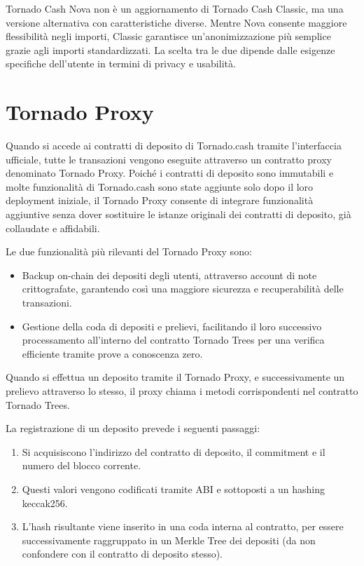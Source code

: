 Tornado Cash Nova non è un aggiornamento di Tornado Cash Classic, ma una versione alternativa con caratteristiche diverse. Mentre Nova consente maggiore flessibilità negli importi, Classic garantisce un'anonimizzazione più semplice grazie agli importi standardizzati. La scelta tra le due dipende dalle esigenze specifiche dell'utente in termini di privacy e usabilità.


\section{Tornado Proxy}

Quando si accede ai contratti di deposito di Tornado.cash tramite l'interfaccia ufficiale, tutte le transazioni vengono eseguite attraverso un contratto proxy denominato Tornado Proxy. Poiché i contratti di deposito sono immutabili e molte funzionalità di Tornado.cash sono state aggiunte solo dopo il loro deployment iniziale, il Tornado Proxy consente di integrare funzionalità aggiuntive senza dover sostituire le istanze originali dei contratti di deposito, già collaudate e affidabili.

Le due funzionalità più rilevanti del Tornado Proxy sono:

\begin{itemize}
    \item Backup on-chain dei depositi degli utenti, attraverso account di note crittografate, garantendo così una maggiore sicurezza e recuperabilità delle transazioni.
    \item Gestione della coda di depositi e prelievi, facilitando il loro successivo processamento all'interno del contratto Tornado Trees per una verifica efficiente tramite prove a conoscenza zero.
\end{itemize}

Quando si effettua un deposito tramite il Tornado Proxy, e successivamente un prelievo attraverso lo stesso, il proxy chiama i metodi corrispondenti nel contratto Tornado Trees.

La registrazione di un deposito prevede i seguenti passaggi:  

\begin{enumerate}
    \item Si acquisiscono l’indirizzo del contratto di deposito, il commitment e il numero del blocco corrente.
    \item Questi valori vengono codificati tramite ABI e sottoposti a un hashing keccak256.
    \item L'hash risultante viene inserito in una coda interna al contratto, per essere successivamente raggruppato in un Merkle Tree dei depositi (da non confondere con il contratto di deposito stesso).
\end{enumerate}

